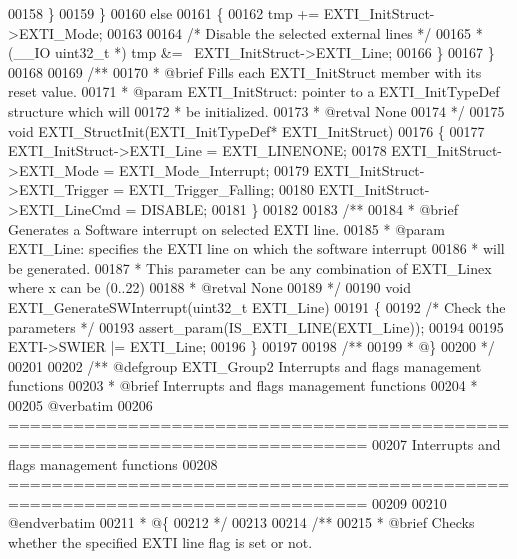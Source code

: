 \begin{DoxyCode}
00158     \}
00159   \}
00160   \textcolor{keywordflow}{else}
00161   \{
00162     tmp += EXTI\_InitStruct->EXTI_Mode;
00163 
00164     \textcolor{comment}{/* Disable the selected external lines */}
00165     *(\_\_IO uint32\_t *) tmp &= ~EXTI\_InitStruct->EXTI\_Line;
00166   \}
00167 \}
00168 
00169 \textcolor{comment}{/**}
00170 \textcolor{comment}{  * @brief  Fills each EXTI\_InitStruct member with its reset value.}
00171 \textcolor{comment}{  * @param  EXTI\_InitStruct: pointer to a EXTI\_InitTypeDef structure which will}
00172 \textcolor{comment}{  *         be initialized.}
00173 \textcolor{comment}{  * @retval None}
00174 \textcolor{comment}{  */}
00175 \textcolor{keywordtype}{void} EXTI_StructInit(EXTI\_InitTypeDef* EXTI\_InitStruct)
00176 \{
00177   EXTI\_InitStruct->EXTI_Line = EXTI_LINENONE;
00178   EXTI\_InitStruct->EXTI_Mode = EXTI_Mode_Interrupt;
00179   EXTI\_InitStruct->EXTI_Trigger = EXTI_Trigger_Falling;
00180   EXTI\_InitStruct->EXTI_LineCmd = DISABLE;
00181 \}
00182 
00183 \textcolor{comment}{/**}
00184 \textcolor{comment}{  * @brief  Generates a Software interrupt on selected EXTI line.}
00185 \textcolor{comment}{  * @param  EXTI\_Line: specifies the EXTI line on which the software interrupt}
00186 \textcolor{comment}{  *         will be generated.}
00187 \textcolor{comment}{  *         This parameter can be any combination of EXTI\_Linex where x can be (0..22)}
00188 \textcolor{comment}{  * @retval None}
00189 \textcolor{comment}{  */}
00190 \textcolor{keywordtype}{void} EXTI_GenerateSWInterrupt(uint32\_t EXTI\_Line)
00191 \{
00192   \textcolor{comment}{/* Check the parameters */}
00193   assert_param(IS\_EXTI\_LINE(EXTI\_Line));
00194 
00195   EXTI->SWIER |= EXTI\_Line;
00196 \}
00197 
00198 \textcolor{comment}{/**}
00199 \textcolor{comment}{  * @\}}
00200 \textcolor{comment}{  */}
00201 
00202 \textcolor{comment}{/** @defgroup EXTI\_Group2 Interrupts and flags management functions}
00203 \textcolor{comment}{ *  @brief   Interrupts and flags management functions }
00204 \textcolor{comment}{ *}
00205 \textcolor{comment}{@verbatim   }
00206 \textcolor{comment}{ ===============================================================================}
00207 \textcolor{comment}{                  Interrupts and flags management functions}
00208 \textcolor{comment}{ ===============================================================================  }
00209 \textcolor{comment}{}
00210 \textcolor{comment}{@endverbatim}
00211 \textcolor{comment}{  * @\{}
00212 \textcolor{comment}{  */}
00213 
00214 \textcolor{comment}{/**}
00215 \textcolor{comment}{  * @brief  Checks whether the specified EXTI line flag is set or not.}

\end{DoxyCode}
